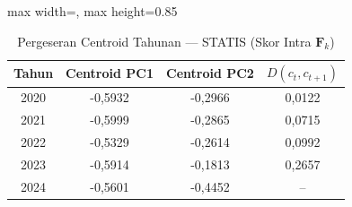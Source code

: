 \begin{table}[H]
\centering
\caption{Pergeseran Centroid Tahunan --- STATIS (Skor Intra $\mathbf{F}_k$)} \label{tab:app1centroid_statis}
\begin{adjustbox}{max width=\textwidth, max height=0.85\textheight}
\begin{tabular}{|c|c|c|c|}
\hline
\textbf{Tahun} & \textbf{Centroid PC1} & \textbf{Centroid PC2} & \textbf{$D(c_t, c_{t+1})$} \\
\hline
2020 & -0,5932 & -0,2966 & 0,0122 \\
2021 & -0,5999 & -0,2865 & 0,0715 \\
2022 & -0,5329 & -0,2614 & 0,0992 \\
2023 & -0,5914 & -0,1813 & 0,2657 \\
2024 & -0,5601 & -0,4452 & -- \\
\hline
\end{tabular}
\end{adjustbox}
\end{table}